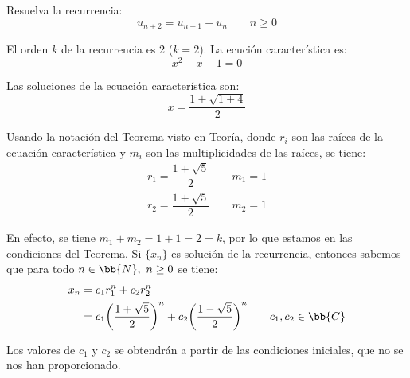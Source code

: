 \begin{ejercicio}\label{ej:recurrenciaFib}
    Resuelva la recurrencia:
    \begin{equation*}
        u_{n+2} = u_{n+1} + u_n\qquad n\geq 0
    \end{equation*}

    El orden $k$ de la recurrencia es 2 ($k = 2$). La ecución característica es:
    \begin{equation*}
        x^2 -x -1 = 0 
    \end{equation*}

    Las soluciones de la ecuación característica son:
    \begin{equation*}
        x = \dfrac{1\pm \sqrt{1+4}}{2}
    \end{equation*}

    Usando la notación del Teorema visto en Teoría, donde $r_i$ son las raíces de la ecuación característica y $m_i$ son las multiplicidades de las raíces, se tiene:
    \begin{gather*}
        r_1 = \dfrac{1+\sqrt{5}}{2} \qquad m_1 = 1 \\
        r_2 = \dfrac{1+\sqrt{5}}{2} \qquad m_2 = 1
    \end{gather*}

    En efecto, se tiene $m_1+m_2 = 1 +1 = 2 = k$, por lo que estamos en las condiciones del Teorema. Si $\{x_n\}$ es solución de la recurrencia, entonces sabemos que para todo $n\in \bb{N},~n \geq 0$ se tiene:
    \begin{align*}
        x_n &= c_1 r_1^n + c_2 r_2^n\\
            &= c_1{\left(\dfrac{1+\sqrt{5}}{2}\right)}^n + c_2 {\left(\dfrac{1-\sqrt{5}}{2}\right)}^n
            \qquad c_1,c_2\in \bb{C}
    \end{align*}
    
    Los valores de $c_1$ y $c_2$ se obtendrán a partir de las condiciones iniciales, que no se nos han proporcionado.
\end{ejercicio}

